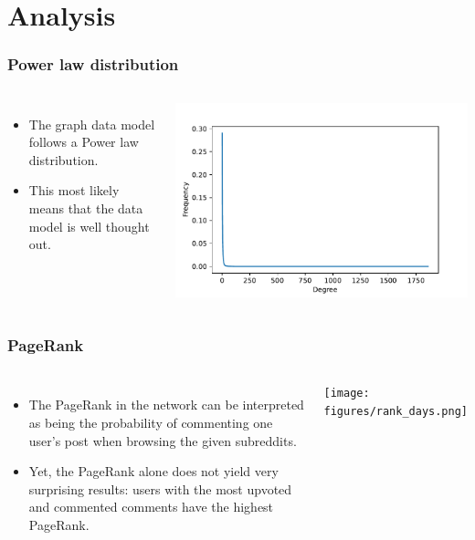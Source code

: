 \documentclass[aspectratio=169]{beamer}
\begin{document}
\section{Analysis}
\begin{frame}[t]
    \frametitle{Power law distribution}
    \vspace{1.0cm}
    \begin{columns}
    \begin{itemize}
        \item The graph data model follows a Power law distribution.
        \item This most likely means that the data model is well thought out.
    \end{itemize}
        \includegraphics[width=\textwidth]{figures/deg_dist.pdf}
    \end{columns}
\end{frame}
\begin{frame}[t]
    \frametitle{PageRank}
    \begin{columns}
    \begin{itemize}
        \item The PageRank in the network can be interpreted as being the probability of commenting one user's post when browsing the given subreddits.
        \item Yet, the PageRank alone does not yield very surprising results: users with the most upvoted and commented comments have the highest PageRank.
    \end{itemize}
        \texttt{[image: figures/rank\_days.png]}
    \end{columns}
\end{frame}
\end{document}
